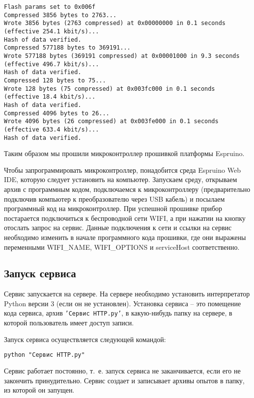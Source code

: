 \documentclass[12pt]{extarticle}
\begin{document}
\begin{enumerate}
\begin{verbatim}
Flash params set to 0x006f
Compressed 3856 bytes to 2763...
Wrote 3856 bytes (2763 compressed) at 0x00000000 in 0.1 seconds (effective 254.1 kbit/s)...
Hash of data verified.
Compressed 577188 bytes to 369191...
Wrote 577188 bytes (369191 compressed) at 0x00001000 in 9.3 seconds (effective 496.7 kbit/s)...
Hash of data verified.
Compressed 128 bytes to 75...
Wrote 128 bytes (75 compressed) at 0x003fc000 in 0.1 seconds (effective 18.4 kbit/s)...
Hash of data verified.
Compressed 4096 bytes to 26...
Wrote 4096 bytes (26 compressed) at 0x003fe000 in 0.1 seconds (effective 633.4 kbit/s)...
Hash of data verified.
\end{verbatim}
\end{enumerate}

Таким образом мы прошили микроконтроллер прошивкой платформы Espruino.



Чтобы запрограммировать микроконтроллер, понадобится среда Espruino Web IDE, которую следует установить на компьютер. Запускаем среду, открываем архив с программным кодом, подключаемся к микроконтроллеру (предварительно подключив компьютер к преобразователю через USB кабель) и посылаем программный код на микроконтроллер. При успешной прошивке прибор постарается подключиться к беспроводной сети WIFI, а при нажатии на кнопку отослать запрос на сервис. Данные подключения к сети и ссылки на сервис необходимо изменить в начале программного кода прошивки, где они выражены переменными WIFI\_NAME, WIFI\_OPTIONS и serviceHost соответственно.


\subsection{Запуск сервиса}\label{Запуск сервиса}

Сервис запускается на сервере. На сервере необходимо установить интерпретатор Python версии 3 (если он не установлен). Установка сервиса -- это помещение кода сервиса, архив \texttt{'Сервис HTTP.py'}, в какую-нибудь папку на сервере, в которой пользователь имеет доступ записи. 

Запуск сервиса осуществляется следующей командой:
\begin{verbatim}
python "Сервис HTTP.py"
\end{verbatim}
Сервис работает постоянно, т.~е. запуск сервиса не заканчивается, если его не закончить принудительно. Сервис создает и записывает архивы опытов в папку, из которой он запущен.
\end{document}
